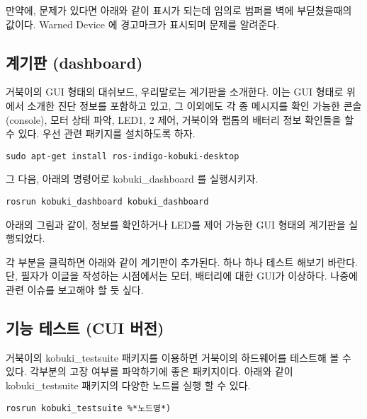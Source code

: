 만약에, 문제가 있다면 아래와 같이 표시가 되는데 임의로 범퍼를 벽에 부딛쳤을때의 값이다. Warned Device 에 경고마크가 표시되며 문제를 알려준다.

\subsection{계기판 (dashboard)}

거북이의 GUI 형태의 대쉬보드, 우리말로는 계기판을 소개한다. 이는 GUI 형태로 위에서 소개한 진단 정보를 포함하고 있고, 그 이외에도 각 종 메시지를 확인 가능한 콘솔(console), 모터 상태 파악, LED1, 2 제어, 거북이와 랩톱의 배터리 정보 확인들을 할 수 있다. 우선 관련 패키지를 설치하도록 하자.

\vspace{\baselineskip}
\begin{lstlisting}[language=ROS]
sudo apt-get install ros-indigo-kobuki-desktop
\end{lstlisting}

그 다음, 아래의 명령어로 kobuki\_dashboard 를 실행시키자.

\vspace{\baselineskip}
\begin{lstlisting}[language=ROS]
rosrun kobuki_dashboard kobuki_dashboard
\end{lstlisting}

아래의 그림과 같이, 정보를 확인하거나 LED를 제어 가능한 GUI 형태의 계기판을 실행되었다. 

각 부분을 클릭하면 아래와 같이 계기판이 추가된다. 하나 하나 테스트 해보기 바란다. 단, 필자가 이글을 작성하는 시점에서는 모터, 배터리에 대한 GUI가 이상하다. 나중에 관련 이슈를 보고해야 할 듯 싶다.

\subsection{기능 테스트 (CUI 버전)}

거북이의 kobuki\_testsuite 패키지를 이용하면 거북이의 하드웨어를 테스트해 볼 수 있다. 각부분의 고장 여부를 파악하기에 좋은 패키지이다. 아래와 같이 kobuki\_testsuite 패키지의 다양한 노드를 실행 할 수 있다. 

\vspace{\baselineskip}
\begin{lstlisting}[language=ROS]
rosrun kobuki_testsuite %*노드명*)
\end{lstlisting}

